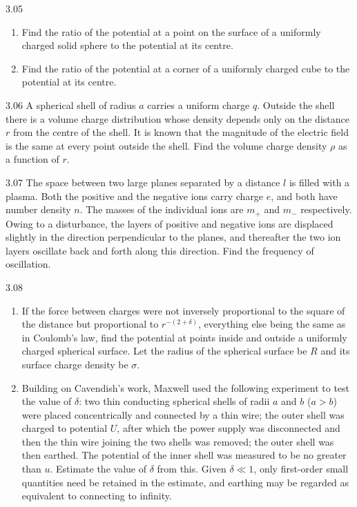 \begin{problem}{3.05}
\begin{enumerate}[label=(\arabic*),leftmargin=2.2em,itemsep=1pt,topsep=2pt]
\item Find the ratio of the potential at a point on the surface of a uniformly charged solid sphere to the potential at its centre.
\item Find the ratio of the potential at a corner of a uniformly charged cube to the potential at its centre.
\end{enumerate}
\end{problem}

\begin{problem}{3.06}
A spherical shell of radius $a$ carries a uniform charge $q$. Outside the shell there is a volume charge distribution whose density depends only on the distance $r$ from the centre of the shell. It is known that the magnitude of the electric field is the same at every point outside the shell. Find the volume charge density $\rho$ as a function of $r$.
\end{problem}

\begin{problem}{3.07}
The space between two large planes separated by a distance $l$ is filled with a plasma. Both the positive and the negative ions carry charge $e$, and both have number density $n$. The masses of the individual ions are $m_+$ and $m_-$ respectively. Owing to a disturbance, the layers of positive and negative ions are displaced slightly in the direction perpendicular to the planes, and thereafter the two ion layers oscillate back and forth along this direction. Find the frequency of oscillation.
\end{problem}

\begin{problem}{3.08}
\begin{enumerate}[label=(\arabic*),leftmargin=2.2em,itemsep=1pt,topsep=2pt]
\item If the force between charges were not inversely proportional to the square of the distance but proportional to $r^{-(2+\delta)}$, everything else being the same as in Coulomb's law, find the potential at points inside and outside a uniformly charged spherical surface. Let the radius of the spherical surface be $R$ and its surface charge density be $\sigma$.
\item Building on Cavendish's work, Maxwell used the following experiment to test the value of $\delta$: two thin conducting spherical shells of radii $a$ and $b$ ($a>b$) were placed concentrically and connected by a thin wire; the outer shell was charged to potential $U$, after which the power supply was disconnected and then the thin wire joining the two shells was removed; the outer shell was then earthed. The potential of the inner shell was measured to be no greater than $u$. Estimate the value of $\delta$ from this. Given $\delta\ll1$, only first-order small quantities need be retained in the estimate, and earthing may be regarded as equivalent to connecting to infinity.
\end{enumerate}
\end{problem}

